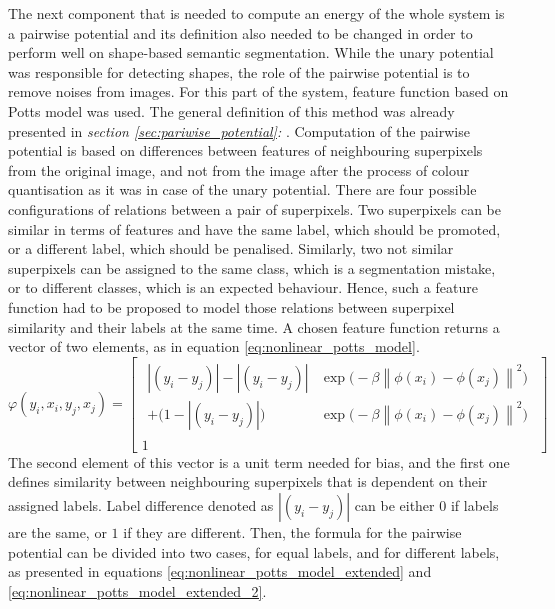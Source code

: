 The next component that is needed to compute an energy of the whole system is a pairwise potential and its definition also needed to be changed in order to perform well on shape-based semantic segmentation. While the unary potential was responsible for detecting shapes, the role of the pairwise potential is to remove noises from images. For this part of the system, feature function based on Potts model was used. The general definition of this method was already presented in \textit{section \ref{sec:pariwise_potential}: }. Computation of the pairwise potential is based on differences between features of neighbouring superpixels from the original image, and not from the image after the process of colour quantisation as it was in case of the unary potential. There are four possible configurations of relations between a pair of superpixels. Two superpixels can be similar in terms of features and have the same label, which should be promoted, or a different label, which should be penalised. Similarly, two not similar superpixels can be assigned to the same class, which is a segmentation mistake, or to different classes, which is an expected behaviour. Hence, such a feature function had to be proposed to model those relations between superpixel similarity and their labels at the same time. A chosen feature function returns a vector of two elements, as in equation \ref{eq:nonlinear_potts_model}.
\begin{equation}
    \label{eq:nonlinear_potts_model}
       \varphi(y_i,x_i,y_j,x_j) = 
       \begin{bmatrix}
            \begin{aligned}
           \left | (y_i - y_j) \right | - \left | (y_i - y_j) \right | &\exp{\big(-\beta \left \| \phi(x_i) - \phi(x_j)\right \|^2\big)} \\ + 
            \big( 1 - \left | (y_i - y_j) \right | \big) &\exp{\big(-\beta \left \| \phi(x_i) - \phi(x_j)\right \|^2\big)} 
        \end{aligned}
        \\ 1
        \end{bmatrix}
\end{equation}
The second element of this vector is a unit term needed for bias, and the first one defines similarity between neighbouring superpixels that is dependent on their assigned labels. Label difference denoted as $\left | (y_i - y_j) \right |$ can be either $0$ if labels are the same, or $1$ if they are different. Then, the formula for the pairwise potential can be divided into two cases, for equal labels, and for different labels, as presented in equations \ref{eq:nonlinear_potts_model_extended} and \ref{eq:nonlinear_potts_model_extended_2}.
